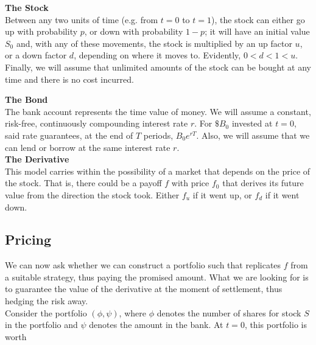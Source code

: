\documentclass{article}
\begin{document}
\textbf{The Stock}\\
Between any two units of time (e.g. from $t=0$ to $t=1$), the stock can either go up with probability $p$, or down with probability $1-p$; it will have an initial value $S_0$ and, with any of these movements, the stock is multiplied by an up factor $u$, or a down factor $d$, depending on where it moves to. Evidently, $0 < d < 1 < u$. Finally, we will assume that unlimited amounts of the stock can be bought at any time and there is no cost incurred.

\begin{center}
\end{center}

\textbf{The Bond}\\
The bank account represents the time value of money. We will assume a constant, risk-free, continuously compounding interest rate $r$. For $\$B_0$ invested at $t=0$, said rate guarantees, at the end of $T$ periods, $B_0 e^{rT}$. Also, we will assume that we can lend or borrow at the same interest rate $r$.\\

\textbf{The Derivative}\\
This model carries within the possibility of a market that depends on the price of the stock. That is, there could be a payoff $f$ with price $f_0$ that derives its future value from the direction the stock took. Either $f_u$ if it went up, or $f_d$ if it went down.

\subsection{Pricing}
We can now ask whether we can construct a portfolio such that replicates $f$ from a suitable strategy, thus paying the promised amount. What we are looking for is to guarantee the value of the derivative at the moment of settlement, thus hedging the risk away.\\

Consider the portfolio $(\phi, \psi)$, where $\phi$ denotes the number of shares for stock $S$ in the portfolio and $\psi$ denotes the amount in the bank. At $t=0$, this portfolio is worth
\end{document}
